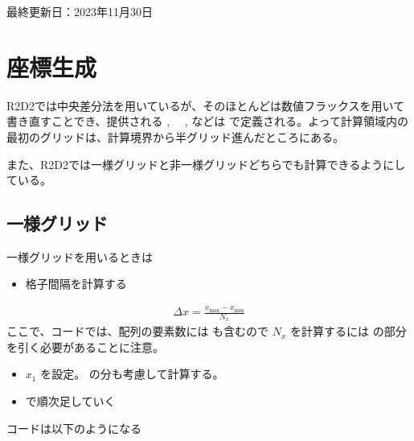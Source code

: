 \documentclass[letterpaper,10pt,dvipdfmx,report]{sphinxmanual}
\begin{document}
\sphinxAtStartPar
最終更新日：2023年11月30日

\sphinxstepscope


\chapter{座標生成}
\label{\detokenize{geometry:id1}}\label{\detokenize{geometry::doc}}
\sphinxAtStartPar
R2D2では中央差分法を用いているが、そのほとんどは数値フラックスを用いて書き直すことでき、提供される  , 　,  などは  で定義される。よって計算領域内の最初のグリッドは、計算境界から半グリッド進んだところにある。

\sphinxAtStartPar
また、R2D2では一様グリッドと非一様グリッドどちらでも計算できるようにしている。


\section{一様グリッド}
\label{\detokenize{geometry:id2}}
\sphinxAtStartPar
一様グリッドを用いるときは
\begin{itemize}
\item {} 
\sphinxAtStartPar
格子間隔を計算する

\end{itemize}
\begin{equation*}
\begin{split}\Delta x = \frac{x_\mathrm{max} - x_\mathrm{min}}{N_x}\end{split}
\end{equation*}
\sphinxAtStartPar
ここで、コードでは、配列の要素数には  も含むので
\(N_x\) を計算するには  の部分を引く必要があることに注意。
\begin{itemize}
\item {} 
\sphinxAtStartPar
\(x_1\) を設定。 の分も考慮して計算する。

\item {} 
\sphinxAtStartPar
{} で順次足していく

\end{itemize}

\sphinxAtStartPar
コードは以下のようになる
\end{document}

